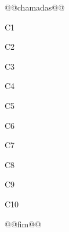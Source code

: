 \documentclass{article}
\begin{document}
@@chamadas@@

C1 \parencite[3]{ibge2011}

C2 \parencite{ibge2010,ibge2011}

C3 \parencite{cfp2005}

C4 \parencite{inca2011}

C5 \textcite{quatro2019}

C6 \parencite[4]{flor1995}

C7 \textcite{andrade1990}

C8 \parencite{asan2016}

C9 \parencite{semdata}

C10 \parencite{stf2021}

\nocite{abnt2011,muitos2020,dunn2021,edf2024,hogan2019,eid2018,bezerra2023,stj2019}
@@fim@@

\printbibliography
\end{document}
